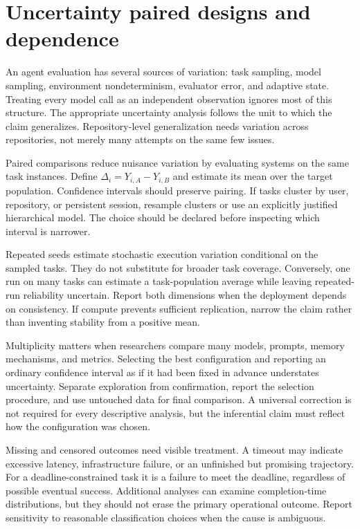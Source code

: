\section{Uncertainty paired designs and dependence}\label{sec:C26:uncertainty}
An agent evaluation has several sources of variation: task sampling, model sampling, environment nondeterminism, evaluator error, and adaptive state. Treating every model call as an independent observation ignores most of this structure. The appropriate uncertainty analysis follows the unit to which the claim generalizes. Repository-level generalization needs variation across repositories, not merely many attempts on the same few issues.

Paired comparisons reduce nuisance variation by evaluating systems on the same task instances. Define $\Delta_i=Y_{i,A}-Y_{i,B}$ and estimate its mean over the target population. Confidence intervals should preserve pairing. If tasks cluster by user, repository, or persistent session, resample clusters or use an explicitly justified hierarchical model. The choice should be declared before inspecting which interval is narrower.

Repeated seeds estimate stochastic execution variation conditional on the sampled tasks. They do not substitute for broader task coverage. Conversely, one run on many tasks can estimate a task-population average while leaving repeated-run reliability uncertain. Report both dimensions when the deployment depends on consistency. If compute prevents sufficient replication, narrow the claim rather than inventing stability from a positive mean.

Multiplicity matters when researchers compare many models, prompts, memory mechanisms, and metrics. Selecting the best configuration and reporting an ordinary confidence interval as if it had been fixed in advance understates uncertainty. Separate exploration from confirmation, report the selection procedure, and use untouched data for final comparison. A universal correction is not required for every descriptive analysis, but the inferential claim must reflect how the configuration was chosen.

Missing and censored outcomes need visible treatment. A timeout may indicate excessive latency, infrastructure failure, or an unfinished but promising trajectory. For a deadline-constrained task it is a failure to meet the deadline, regardless of possible eventual success. Additional analyses can examine completion-time distributions, but they should not erase the primary operational outcome. Report sensitivity to reasonable classification choices when the cause is ambiguous.

